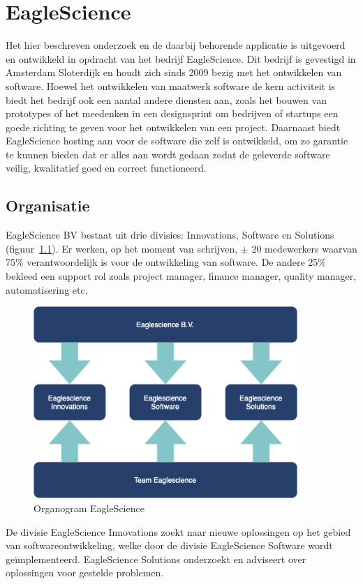 \chapter{EagleScience}\label{ch:EagleScience} %

Het hier beschreven onderzoek en de daarbij behorende applicatie is uitgevoerd en ontwikkeld in opdracht van het bedrijf EagleScience. Dit bedrijf is gevestigd in Amsterdam Sloterdijk en houdt zich sinds 2009 bezig met het ontwikkelen van software. Hoewel het ontwikkelen van maatwerk software de kern activiteit is biedt het bedrijf ook een aantal andere diensten aan, zoals het bouwen van prototypes of het meedenken in een designsprint om bedrijven of startups een goede richting te geven voor het ontwikkelen van een project. Daarnaast biedt EagleScience hosting aan voor de software die zelf is ontwikkeld, om zo garantie te kunnen bieden dat er alles aan wordt gedaan zodat de geleverde software veilig, kwalitatief goed en correct functioneerd.

\section{Organisatie}\label{sec:organisatie}
EagleScience BV bestaat uit drie divisies: Innovations, Software en Solutions (figuur~\ref{fig:EagleScience organogram}). Er werken, op het moment van schrijven, $\pm$ 20 medewerkers waarvan 75\% verantwoordelijk is voor de ontwikkeling van software. De andere 25\% bekleed een support rol zoals project manager, finance manager, quality manager, automatisering etc.

\begin{figure}[bth]
\myfloatalign
\includegraphics[width=10cm]{gfx/organogram}
\caption{Organogram EagleScience}
\label{fig:EagleScience organogram}
\end{figure}
De divisie EagleScience Innovations zoekt naar nieuwe oplossingen op het gebied van softwareontwikkeling, welke door de divisie EagleScience Software wordt geïmplementeerd. EagleScience Solutions onderzoekt en adviseert over oplossingen voor gestelde problemen.\\

